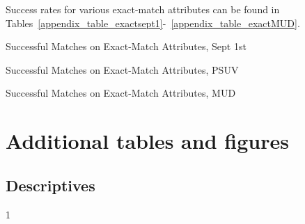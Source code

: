 \documentclass[12pt]{article}
\newcommand{\jop}{0} %
\begin{document}
Success rates for various exact-match attributes can be found in Tables~\ref{appendix_table_exactsept1}-~\ref{appendix_table_exactMUD}.

\begin{table}
    \centering
    \caption{Successful Matches on Exact-Match Attributes, Sept 1st}\label{appendix_table_exactsept1}
    
\end{table}

\begin{table}
    \centering
    \caption{Successful Matches on Exact-Match Attributes, PSUV}\label{appendix_table_exactPSUV}
    
\end{table}

\begin{table}
    \centering
    \caption{Successful Matches on Exact-Match Attributes, MUD}\label{appendix_table_exactMUD}
    
\end{table}










\section{Additional tables and figures}\label{appendix_extras}


\subsection{Descriptives}\label{sec:descriptivegraphs}




	\if\jop1
	\linespread{1}\selectfont
	\fi
\end{document}
